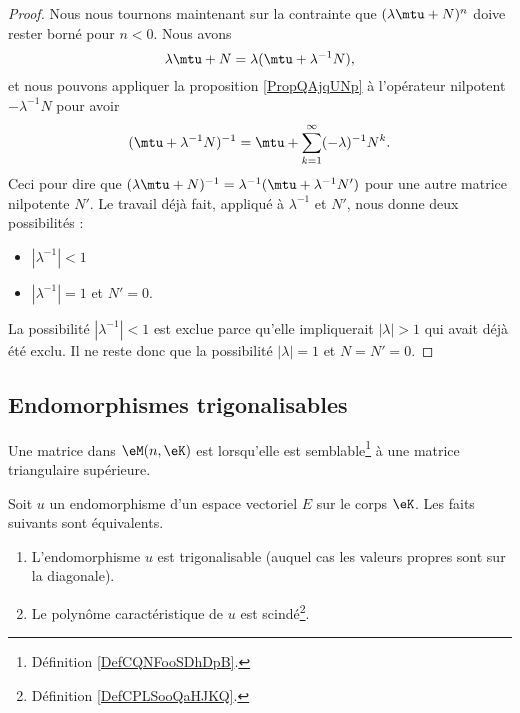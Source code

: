 \begin{proof}
    Nous nous tournons maintenant sur la contrainte que \( (\lambda\mtu+N)^n\) doive rester borné pour \( n<0\). Nous avons
    \begin{equation}
        \lambda\mtu+N=\lambda(\mtu+\lambda^{-1}N),
    \end{equation}
    et nous pouvons appliquer la proposition \ref{PropQAjqUNp} à l'opérateur nilpotent \( -\lambda^{-1} N\) pour avoir
    \begin{equation}
        (\mtu+\lambda^{-1}N)^{-1}=\mtu+\sum_{k=1}^{\infty}(-\lambda)^{-1}N^k.
    \end{equation}
    Ceci pour dire que \( (\lambda\mtu+N)^{-1}=\lambda^{-1}(\mtu+\lambda^{-1}N')\) pour une autre matrice nilpotente \( N'\). Le travail déjà fait, appliqué à \( \lambda^{-1}\) et \( N'\), nous donne deux possibilités :
    \begin{itemize}
        \item \( | \lambda^{-1} |<1\)
        \item \( | \lambda^{-1} |=1\) et \( N'=0\).
    \end{itemize}
    La possibilité \( | \lambda^{-1} |<1\) est exclue parce qu'elle impliquerait \( | \lambda |>1\) qui avait déjà été exclu. Il ne reste donc que la possibilité \( | \lambda |=1\) et \( N=N'=0\).
\end{proof}

\subsection{Endomorphismes trigonalisables}

\begin{definition}
    Une matrice dans \( \eM(n,\eK)\) est  lorsqu'elle est semblable\footnote{Définition \ref{DefCQNFooSDhDpB}.} à une matrice triangulaire supérieure.
\end{definition}

\begin{proposition} \label{PropKNVFooQflQsJ}
    Soit \( u\) un endomorphisme d'un espace vectoriel \( E\) sur le corps \( \eK\). Les faits suivants sont équivalents.
    \begin{enumerate}
        \item   \label{ItemZKDMooOrTHkwi}
            L'endomorphisme \( u\) est trigonalisable (auquel cas les valeurs propres sont sur la diagonale).
        \item   \label{ItemZKDMooOrTHkwii}
            Le polynôme caractéristique de \( u\) est scindé\footnote{Définition \ref{DefCPLSooQaHJKQ}.}.
    \end{enumerate}
\end{proposition}

